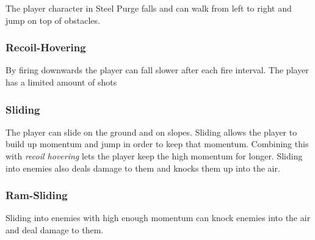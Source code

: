 \documentclass[../Main.tex]{subfiles}
\begin{document}
The player character in Steel Purge falls and can walk from left to right and jump on top of obstacles.

\subsubsection{Recoil-Hovering}

By firing downwards the player can fall slower after each fire interval. The player has a limited amount of shots 

\subsubsection{Sliding}

The player can slide on the ground and on slopes. Sliding allows the player to build up momentum and jump in order to keep that momentum. Combining this with \emph{recoil hovering} lets the player keep the high momentum for longer. Sliding into enemies also deals damage to them and knocks them up into the air. 

\subsubsection{Ram-Sliding}

Sliding into enemies with high enough momentum can knock enemies into the air and deal damage to them. 
\end{document}
